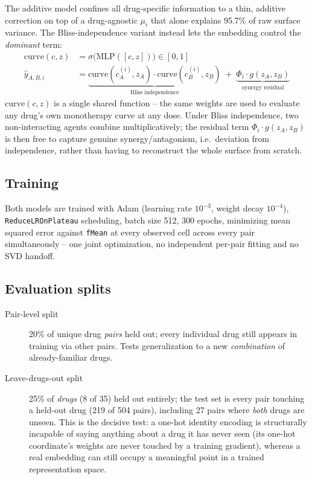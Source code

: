 \documentclass[11pt]{article}
\begin{document}
The additive model confines all drug-specific information to a thin, additive correction on top of a drug-agnostic $\mu_i$ that alone explains 95.7\% of raw surface variance. The Bliss-independence variant instead lets the embedding control the \emph{dominant} term:
\begin{align}
\mathrm{curve}(c, z) &= \sigma\big(\mathrm{MLP}([c, z])\big) \in [0,1] \\
\hat{y}_{A,B,i} &= \underbrace{\mathrm{curve}(c_A^{(i)}, z_A) \cdot \mathrm{curve}(c_B^{(i)}, z_B)}_{\text{Bliss independence}} \;+\; \underbrace{\Phi_i \cdot g(z_A, z_B)}_{\text{synergy residual}}
\end{align}
$\mathrm{curve}(c, z)$ is a single shared function -- the same weights are used to evaluate any drug's own monotherapy curve at any dose. Under Bliss independence, two non-interacting agents combine multiplicatively; the residual term $\Phi_i \cdot g(z_A, z_B)$ is then free to capture genuine synergy/antagonism, i.e.\ deviation from independence, rather than having to reconstruct the whole surface from scratch.

\subsection{Training}

Both models are trained with Adam (learning rate $10^{-3}$, weight decay $10^{-4}$), \texttt{ReduceLROnPlateau} scheduling, batch size 512, 300 epochs, minimizing mean squared error against \texttt{fMean} at every observed cell across every pair simultaneously -- one joint optimization, no independent per-pair fitting and no SVD handoff.

\subsection{Evaluation splits}

\begin{description}
\item[Pair-level split] 20\% of unique drug \emph{pairs} held out; every individual drug still appears in training via other pairs. Tests generalization to a new \emph{combination} of already-familiar drugs.
\item[Leave-drugs-out split] 25\% of \emph{drugs} (8 of 35) held out entirely; the test set is every pair touching a held-out drug (219 of 504 pairs), including 27 pairs where \emph{both} drugs are unseen. This is the decisive test: a one-hot identity encoding is structurally incapable of saying anything about a drug it has never seen (its one-hot coordinate's weights are never touched by a training gradient), whereas a real embedding can still occupy a meaningful point in a trained representation space.
\end{description}
\end{document}
